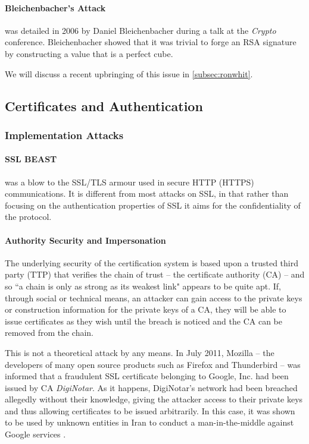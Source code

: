 	 \paragraph{Bleichenbacher's Attack} was detailed in 2006 by Daniel Bleichenbacher during a talk at the \emph{Crypto} conference. Bleichenbacher showed that it was trivial to forge an RSA signature by constructing a value that is a perfect cube. 
          
          We will discuss a recent upbringing of this issue in \textsection\ref{subsec:ronwhit}.

  \subsection{Certificates and Authentication}
  
    \subsubsection{Implementation Attacks}
    
      \paragraph{SSL BEAST} was a blow to the SSL/TLS armour used in secure HTTP (HTTPS) communications. It is different from most attacks on SSL, in that rather than focusing on the authentication properties of SSL it aims for the confidentiality of the protocol.
    
      \paragraph{Authority Security and Impersonation}
      
        The underlying security of the certification system is based upon a trusted third party (TTP) that verifies the chain of trust -- the certificate authority (CA) -- and so ``a chain is only as strong as its weakest link" appears to be quite apt. If, through social or technical means, an attacker can gain access to the private keys or construction information for the private keys of a CA, they will be able to issue certificates as they wish until the breach is noticed and the CA can be removed from the chain.
    
        This is not a theoretical attack by any means. In July 2011, Mozilla -- the developers of many open source products such as Firefox and Thunderbird -- was informed that a fraudulent SSL certificate belonging to Google, Inc. had been issued by CA \emph{DigiNotar}. As it happens, DigiNotar's network had been breached allegedly without their knowledge, giving the attacker access to their private keys and thus allowing certificates to be issued arbitrarily. In this case, it was shown to be used by unknown entities in Iran to conduct a man-in-the-middle against Google services \cite{Google:2011ah}.

